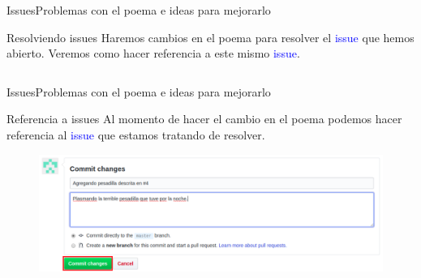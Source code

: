\documentclass[10pt]{beamer}
\begin{document}
\begin{frame}{Issues}{Problemas con el poema e ideas para mejorarlo}

\begin{block}{Resolviendo issues}
Haremos cambios en el poema para resolver el \textcolor{blue}{issue} que hemos abierto. Veremos como hacer referencia a este mismo \textcolor{blue}{issue}.
\begin{columns}[c]
\column{1.7in}
\vspace{0.2in}

\column{1.7in}
\end{columns}
    
\end{block}

\end{frame}

\begin{frame}{Issues}{Problemas con el poema e ideas para mejorarlo}

\begin{block}{Referencia a issues}
Al momento de hacer el cambio en el poema podemos hacer referencia al \textcolor{blue}{issue} que estamos tratando de resolver.
\vspace{-0.1in}
\begin{figure}[h!]
\centering
\includegraphics [scale=0.35]{referenceissue}
\label{fig:first}
\end{figure}
    
\end{block}

\end{frame}
\end{document}
